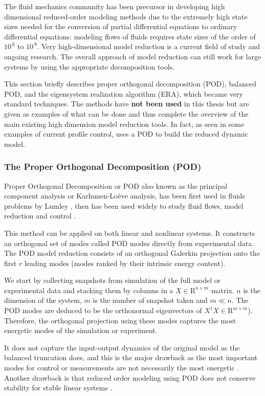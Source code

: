 \documentclass[12pt,lot, lof]{puthesis}
\begin{document}
The fluid mechanics community has been precursor in developing high dimensional reduced-order modeling methods due to the extremely high state sizes needed for the conversion of partial differential equations to ordinary differential equations: modeling flows of fluids requires state sizes of the order of $10^{\, 6}$ to $10^{\, 9}$. Very high-dimensional model reduction is a current field of study and ongoing research. The overall approach of model reduction can still work for large systems by using the appropriate decomposition tools.

This section  briefly describes proper orthogonal decomposition (POD), balanced POD, and the eigensystem realization algorithm (ERA), which became very standard techniques. The methods have \textbf{not been used} in this thesis but are given as examples of what can be done and thus complete the overview of the main existing high dimension model reduction tools. In fact, as seen in some examples of current profile control, \cite{Xu11} uses a POD to build the reduced dynamic model.

\subsubsection{The Proper Orthogonal Decomposition (POD)}
Proper Orthogonal Decomposition or POD also known as the principal component analysis or Karhunen-Loève analysis, has been first used in fluids problems by Lumley \cite{Lumley67, Lumley70}, then has been used widely to study fluid flows, model reduction and control \cite{Sirovich87, Aubry88, Holmes96}. 

This method can be applied on both linear and nonlinear systems. It constructs an orthogonal set of modes called POD modes directly from experimental data. The POD model reduction consists of an orthogonal Galerkin projection onto the first $r$ leading modes (modes ranked by their intrinsic energy content). 

We start by collecting snapshots from simulation of the full model or experimental data and stacking them by columns in a $X \in \text{R}^{n \times m}$ matrix. $n$ is the dimension of the system, $m$ is the number of snapshot taken and $m \ll n$.
The POD modes are deduced to be the orthonormal eigenvectors of $X^{\dagger}X \in \text{R}^{m \times m}$). Therefore, the orthogonal projection using these modes captures the most energetic modes of the simulation or experiment.

It does not capture the input-output dynamics of the original model as the balanced truncation does, and this is the major drawback as the most important modes for control or measurements are not necessarily the most energetic \cite{Smith05, Ilak08}. Another drawback is that reduced order modeling using POD does not conserve stability for stable linear systems \cite{Smith03}.
\end{document}

